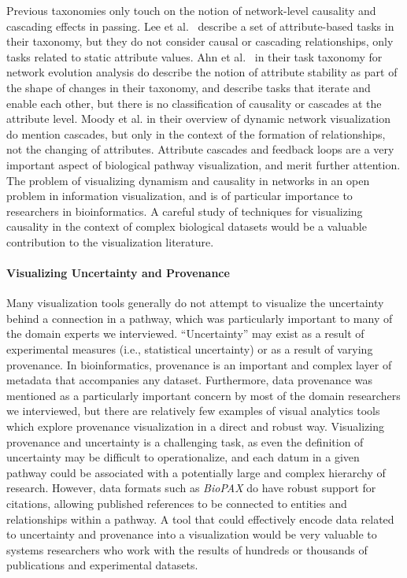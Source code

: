 \documentclass[twocolumn]{bmcart}%
\begin{document}
Previous taxonomies only touch on the notion of network-level causality and cascading effects in passing.
Lee et al.~\cite{Lee2006} describe a set of attribute-based tasks in their taxonomy, but they do not consider causal or cascading relationships, only tasks related to static attribute values.
Ahn et al.~\cite{Ahn2014} in their task taxonomy for network evolution analysis do describe the notion of attribute stability as part of the shape of changes in their taxonomy, and describe tasks that iterate and enable each other, but there is no classification of causality or cascades at the attribute level.
Moody et al. in their overview of dynamic network visualization~\cite{moody2005dynamic} do mention cascades, but only in the context of the formation of relationships, not the changing of attributes.
Attribute cascades and feedback loops are a very important aspect of biological pathway visualization, and merit further attention.
The problem of visualizing dynamism and causality in networks in an open problem in information visualization, and is of particular importance to researchers in bioinformatics.
A careful study of techniques for visualizing causality in the context of complex biological datasets would be a valuable contribution to the visualization literature.

\paragraph{Visualizing Uncertainty and Provenance}

Many visualization tools generally do not attempt to visualize the uncertainty behind a connection in a pathway, which was particularly important to many of the domain experts we interviewed.
``Uncertainty'' may exist as a result of experimental measures (i.e., statistical uncertainty) or as a result of varying provenance.
In bioinformatics, provenance is an important and complex layer of metadata that accompanies any dataset.
Furthermore, data provenance was mentioned as a particularly important concern by most of the domain researchers we interviewed, but there are relatively few examples of visual analytics tools which explore provenance visualization in a direct and robust way.
Visualizing provenance and uncertainty is a challenging task, as even the definition of uncertainty may be difficult to operationalize, and each datum in a given pathway could be associated with a potentially large and complex hierarchy of research.
However, data formats such as \emph{BioPAX} do have robust support for citations, allowing published references to be connected to entities and relationships within a pathway.
A tool that could effectively encode data related to uncertainty and provenance into a visualization would be very valuable to systems researchers who work with the results of hundreds or thousands of publications and experimental datasets.
\end{document}
